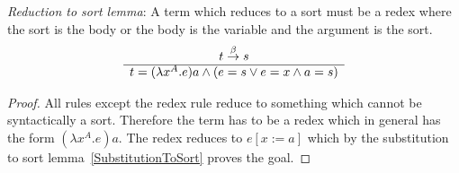 \begin{lemma}
    \emph{Reduction to sort lemma}: A term which reduces to a sort must be a
    redex where the sort is the body or the body is the variable and the
    argument is the sort.
    $$
    \begin{array}{c} 
        t \stackrel{\beta}{\to} s
     \\ \hline 
        t = (\lambda x^A. e) a \land (e = s \lor e = x \land a = s)
    \end{array}
    $$

    \begin{proof}
        All rules except the redex rule reduce to something which cannot be
        syntactically a sort. Therefore the term has to be a redex which in
        general has the form $(\lambda x^A.e) a$. The redex reduces to $e[x:=a]$
        which by the substitution to sort lemma~\ref{SubstitutionToSort} proves
        the goal.
    \end{proof}
\end{lemma}


